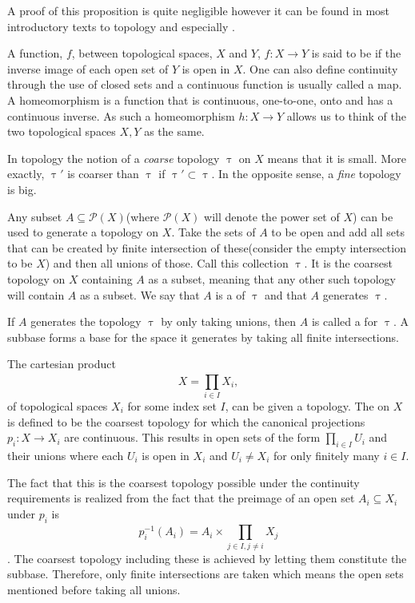 \documentclass[../../main.tex]{subfiles}
\begin{document}
    A proof of this proposition is quite negligible however it can be found in most introductory texts to topology and especially \cite{armstrong-basictop}.
    
    A function, $f$, between topological spaces, $X$ and $Y$, $f:X\to Y$ is said to be  if the inverse image of each open set of $Y$ is open in $X$. One can also define continuity through the use of closed sets and a continuous function is usually called a map. A homeomorphism is a function that is continuous, one-to-one, onto and has a continuous inverse. As such a homeomorphism $h:X\to Y$ allows us to think of the two topological spaces $X, Y$ as the same.
    
    In topology the notion of a \textit{coarse} topology $\uptau$ on $X$ means that it is small. More exactly, $\uptau'$ is coarser than $\uptau$ if $\uptau' \subset \uptau$. In the opposite sense, a \textit{fine} topology is big.
    
    Any subset $A \subseteq \mathcal{P}(X)$(where $\mathcal{P}(X)$ will denote the power set of $X$) can be used to generate a topology on $X$. Take the sets of $A$ to be open and add all sets that can be created by finite intersection of these(consider the empty intersection to be $X$) and then all unions of those. Call this collection $\uptau$. It is the coarsest topology on $X$ containing $A$ as a subset, meaning that any other such topology will contain $A$ as a subset. We say that $A$ is a  of $\uptau$ and that $A$ generates $\uptau$.
    
    If $A$ generates the topology $\uptau$ by only taking unions, then $A$ is called a  for $\uptau$. A subbase forms a base for the space it generates by taking all finite intersections.
    
    \begin{definition}
        The cartesian product $$X=\prod_{i\in I}^{}X_i,$$ of topological spaces $X_i$ for some index set $I$, can be given a topology. The  on $X$ is defined to be the coarsest topology for which the canonical projections $p_i:X\to X_i$ are continuous. This results in open sets of the form $ \prod_{i\in I}U_i$ and their unions where each $U_i$ is open in $X_i$ and $U_i \ne X_i$ for only finitely many $i\in I$.
    \end{definition}

    The fact that this is the coarsest topology possible under the continuity requirements is realized from the fact that the preimage of an open set $A_i \subseteq X_i$ under $p_i$ is $$p_i^{-1}(A_i) = A_i \times \prod_{j \in I, j \ne i}^{}X_j$$. The coarsest topology including these is achieved by letting them constitute the subbase. Therefore, only finite intersections are taken which means the open sets mentioned before taking all unions.
    
\end{document}
